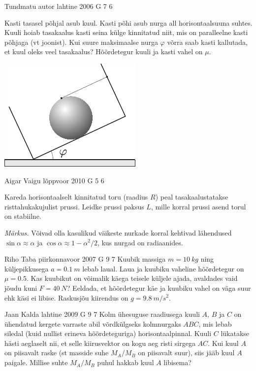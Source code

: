 \documentclass[11pt]{article}
\begin{document}
{%
{Tundmatu autor} %
{lahtine} %
{2006} %
{G 7} %
{6} %
{
\ifStatement
Kasti tasasel põhjal asub kuul. Kasti põhi asub nurga all horisontaalsuuna suhtes. Kuuli hoiab tasakaalus kasti seina külge kinnitatud niit, mis on paralleelne kasti põhjaga (vt joonist). Kui suure maksimaalse nurga $\varphi$ võrra saab kasti kallutada, et kuul oleks veel tasakaalus? Hõõrdetegur kuuli ja kasti vahel on $\mu$.

\begin{center}
	\includegraphics[width=0.5\linewidth]{2006-lahg-07-yl}
\end{center}
\fi
}

{Aigar Vaigu} %
{lõppvoor} %
{2010} %
{G 5} %
{6} %
{
\ifStatement
Kareda horisontaalselt kinnitatud toru (raadius $R$) peal tasakaalustatakse risttahukakujulist prussi. Leidke prussi paksus $L$, mille
korral prussi asend torul on stabiilne.

\emph{Märkus.} Võivad olla kasulikud väikeste nurkade korral kehtivad lähendused
$\sin\alpha\approx \alpha$ ja $\cos\alpha\approx 1-\alpha^2/2$, kus nurgad on radiaanides.
\fi
}

{Riho Taba} %
{piirkonnavoor} %
{2007} %
{G 9} %
{7} %
{
\ifStatement
Kuubik massiga $m = \SI{10}{kg}$ ning küljepikkusega $a = \SI{0,1}{m}$ lebab laual. Laua ja kuubiku vaheline hõõrdetegur on $\mu = \num{0,5}$. Kas kuubikut on võimalik käega teisele küljele ajada, avaldades vaid jõudu kuni $F = \SI{40}{N}$? Eeldada, et hõõrdetegur käe ja kuubiku vahel on väga suur ehk käsi ei libise. Raskusjõu kiirendus on $g = \SI{9,8}{m/s^2}$.
\fi
}

{Jaan Kalda} %
{lahtine} %
{2009} %
{G 9} %
{7} %
{
\ifStatement
Kolm ühesuguse raadiusega kuuli $A$, $B$ ja $C$ on ühendatud kergete varraste abil võrdkülgseks kolmnurgaks $ABC$, mis lebab siledal (kuid nullist erineva hõõrdeteguriga) horisontaalpinnal. Kuuli $C$ lükatakse hästi aeglaselt nii, et selle kiirusvektor on kogu aeg risti sirgega $AC$. Kui kuul $A$ on piisavalt raske (st masside suhe $M_A/M_B$ on piisavalt suur), siis jääb kuul $A$ paigale. Millise suhte $M_A/M_B$ puhul hakkab kuul $A$ libisema?
\fi
}

}
\end{document}
